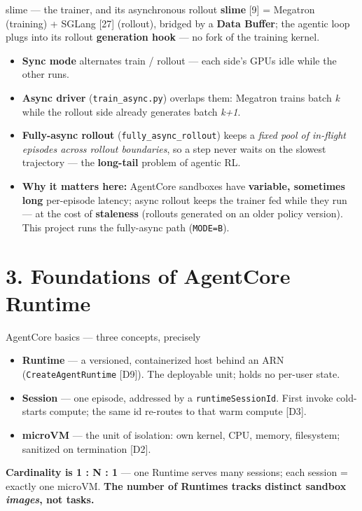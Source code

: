 \documentclass[
  10pt,
  ignorenonframetext,
  aspectratio=169,
  t]{beamer}
\providecommand{\tightlist}{%
  \setlength{\itemsep}{0pt}\setlength{\parskip}{0pt}}
\begin{document}
\begin{frame}{slime --- the trainer, and its asynchronous
rollout}
\textbf{slime} {[}9{]} = Megatron (training) + SGLang {[}27{]}
(rollout), bridged by a \textbf{Data Buffer}; the agentic loop plugs
into its rollout \textbf{generation hook} --- no fork of the training
kernel.

\begin{itemize}
\tightlist
\item
  \textbf{Sync mode} alternates train / rollout --- each side's GPUs
  idle while the other runs.
\item
  \textbf{Async driver} (\texttt{train\_async.py}) overlaps them:
  Megatron trains batch \emph{k} while the rollout side already
  generates batch \emph{k+1}.
\item
  \textbf{Fully-async rollout} (\texttt{fully\_async\_rollout}) keeps a
  \emph{fixed pool of in-flight episodes across rollout boundaries}, so
  a step never waits on the slowest trajectory --- the
  \textbf{long-tail} problem of agentic RL.
\item
  \textbf{Why it matters here:} AgentCore sandboxes have
  \textbf{variable, sometimes long} per-episode latency; async rollout
  keeps the trainer fed while they run --- at the cost of
  \textbf{staleness} (rollouts generated on an older policy version).
  This project runs the fully-async path (\texttt{MODE=B}).
\end{itemize}
\end{frame}

\hypertarget{foundations-of-agentcore-runtime}{%
\section{3. Foundations of AgentCore
Runtime}\label{foundations-of-agentcore-runtime}}

\begin{frame}{AgentCore basics --- three concepts, precisely}
\protect\hypertarget{agentcore-basics-three-concepts-precisely}{}
\begin{itemize}
\tightlist
\item
  \textbf{Runtime} --- a versioned, containerized host behind an ARN
  (\texttt{CreateAgentRuntime} {[}D9{]}). The deployable unit; holds no
  per-user state.
\item
  \textbf{Session} --- one episode, addressed by a
  \texttt{runtimeSessionId}. First invoke cold-starts compute; the same
  id re-routes to that warm compute {[}D3{]}.
\item
  \textbf{microVM} --- the unit of isolation: own kernel, CPU, memory,
  filesystem; sanitized on termination {[}D2{]}.
\end{itemize}

\textbf{Cardinality is 1 : N : 1} --- one Runtime serves many sessions;
each session = exactly one microVM. \textbf{The number of Runtimes
tracks distinct sandbox \emph{images}, not tasks.}
\end{frame}
\end{document}
